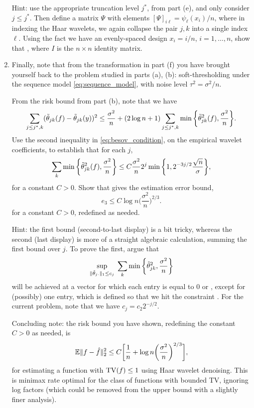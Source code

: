 \documentclass{article}
\begin{document}
\begin{enumerate}[label=(\alph*)]
  Hint: use the appropriate truncation level $j^*$, from part (e), and only
  consider $j \leq j^*$. Then define a matrix $\Psi$ with elements $[\Psi]_{i
    \ell} = \psi_\ell(x_i)/n$, where in indexing the Haar wavelets, we again
  collapse the pair $j,k$ into a single index $\ell$. Using the fact we have an
  evenly-spaced design $x_i = i/n$, $i=1,\dots,n$, show that , where $I$ is the $n \times n$ identity matrix.        

\item Finally, note that from the transformation in part (f) you have brought
  yourself back to the problem studied in parts (a), (b): soft-thresholding
  under the sequence model \eqref{eq:sequence_model}, with noise level $\tau^2 =
  \sigma^2/n$. 

  From the risk bound from part (b), note that we have
  \[
  \sum_{j \leq j^*,k} (\tilde\theta_{jk}(f) - \tilde\theta_{jk}(y))^2 \leq 
  \frac{\sigma^2}{n} + (2 \log{n} + 1) \sum_{j \leq j^*,k} \min 
  \bigg \{ \tilde\theta_{jk}^2(f), \frac{\sigma^2}{n} \bigg\}.
  \]
  Use the second inequality in \eqref{eq:besov_condition}, on the empirical
  wavelet coefficients, to establish that for each $j$, 
  \marginpar{\small [4 pts]}
  \[
  \sum_k \min \bigg\{ \tilde\theta_{jk}^2(f), \frac{\sigma^2}{n} \bigg\} \leq
  C \frac{\sigma^2}{n} 2^j \min\bigg\{ 1, 2^{-3j/2} \frac{\sqrt{n}}{\sigma}
  \bigg\},  
  \]
  for a constant $C>0$. Show that gives the estimation error bound, 
  \marginpar{\small [2 pts]}
  \[
  e_3 \leq C \log{n} \bigg( \frac{\sigma^2}{n} \bigg)^{2/3}.
  \]
  for a constant $C>0$, redefined as needed.

  Hint: the first bound (second-to-last display) is a bit tricky, whereas the
  second (last display) is more of a straight algebraic calculation, summing the
  first bound over $j$. To prove the first, argue that 
  \[
  \sup_{\|\tilde\theta_{j \cdot}\|_1 \leq c_j} \; \sum_k \min \bigg\{
  \tilde\theta_{jk}^2, \frac{\sigma^2}{n} \bigg\}   
  \]
  will be achieved at a vector  for which each entry
  is equal to $0$ or , except for (possibly) one
  entry, which is defined so that we hit the constraint . For the current problem, note that we have $c_j = c_2
  2^{-j/2}$.   

  Concluding note: the risk bound you have shown, redefining the constant $C>0$
  as needed, is  
  \[
  \mathbb{E} \|f - \hat{f}\|_2^2\leq C\bigg[ \frac{1}{n} + \log{n} \bigg(
  \frac{\sigma^2}{n} \bigg)^{2/3} \bigg],   
  \]
  for estimating a function with $\mathrm{TV}(f) \leq 1$ using Haar wavelet
  denoising. This is minimax rate optimal for the class of functions with
  bounded TV, ignoring log factors (which could be removed from the upper bound
  with a slightly finer analysis).
\end{enumerate}
\end{document}
